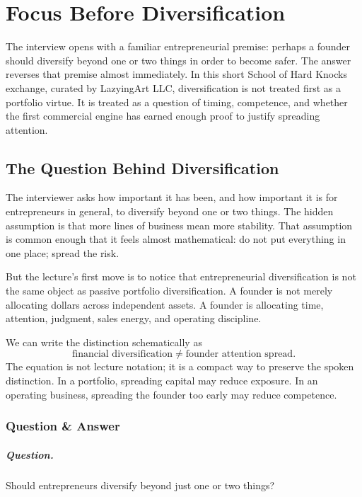 \chapter{Focus Before Diversification}

The interview opens with a familiar entrepreneurial premise: perhaps a founder should diversify beyond one or two things in order to become safer. The answer reverses that premise almost immediately. In this short School of Hard Knocks exchange, curated by LazyingArt LLC, diversification is not treated first as a portfolio virtue. It is treated as a question of timing, competence, and whether the first commercial engine has earned enough proof to justify spreading attention.

\section{The Question Behind Diversification}

The interviewer asks how important it has been, and how important it is for entrepreneurs in general, to diversify beyond one or two things. The hidden assumption is that more lines of business mean more stability. That assumption is common enough that it feels almost mathematical: do not put everything in one place; spread the risk.

But the lecture's first move is to notice that entrepreneurial diversification is not the same object as passive portfolio diversification. A founder is not merely allocating dollars across independent assets. A founder is allocating time, attention, judgment, sales energy, and operating discipline.

We can write the distinction schematically as
\begin{equation}
\text{financial diversification}
\neq
\text{founder attention spread}.
\end{equation}
The equation is not lecture notation; it is a compact way to preserve the spoken distinction. In a portfolio, spreading capital may reduce exposure. In an operating business, spreading the founder too early may reduce competence.

\subsection{Question \& Answer}

\paragraph{Question.}
Should entrepreneurs diversify beyond just one or two things?


